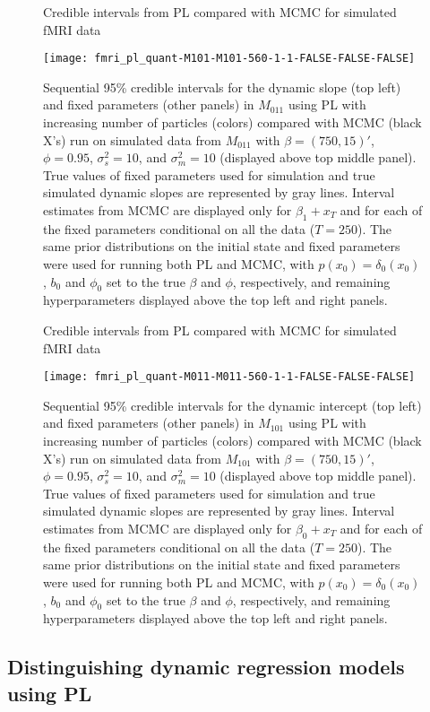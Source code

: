 \begin{figure}
\ssp
\centering
\caption{Credible intervals from PL compared with MCMC for simulated fMRI data} \label{fig:fmri:quant:M011}
\texttt{[image: fmri\_pl\_quant-M101-M101-560-1-1-FALSE-FALSE-FALSE]}
\caption*{Sequential 95\% credible intervals for the dynamic slope (top left) and fixed parameters (other panels) in $M_{011}$ using PL with increasing number of particles (colors) compared with MCMC (black X's) run on simulated data from $M_{011}$ with $\beta = (750,15)'$, $\phi = 0.95$, $\sigma^2_s = 10$, and $\sigma^2_m = 10$ (displayed above top middle panel). True values of fixed parameters used for simulation and true simulated dynamic slopes are represented by gray lines. Interval estimates from MCMC are displayed only for $\beta_1 + x_T$ and for each of the fixed parameters conditional on all the data ($T = 250$). The same prior distributions on the initial state and fixed parameters were used for running both PL and MCMC, with $p(x_0) = \delta_{0}(x_0)$, $b_0$ and $\phi_0$ set to the true $\beta$ and $\phi$, respectively, and remaining hyperparameters displayed above the top left and right panels.}
\end{figure}

\begin{figure}
\ssp
\centering
\caption{Credible intervals from PL compared with MCMC for simulated fMRI data} \label{fig:fmri:quant:M101}
\texttt{[image: fmri\_pl\_quant-M011-M011-560-1-1-FALSE-FALSE-FALSE]}
\caption*{Sequential 95\% credible intervals for the dynamic intercept (top left) and fixed parameters (other panels) in $M_{101}$ using PL with increasing number of particles (colors) compared with MCMC (black X's) run on simulated data from $M_{101}$ with $\beta = (750,15)'$, $\phi = 0.95$, $\sigma^2_s = 10$, and $\sigma^2_m = 10$ (displayed above top middle panel). True values of fixed parameters used for simulation and true simulated dynamic slopes are represented by gray lines. Interval estimates from MCMC are displayed only for $\beta_0 + x_T$ and for each of the fixed parameters conditional on all the data ($T = 250$). The same prior distributions on the initial state and fixed parameters were used for running both PL and MCMC, with $p(x_0) = \delta_{0}(x_0)$, $b_0$ and $\phi_0$ set to the true $\beta$ and $\phi$, respectively, and remaining hyperparameters displayed above the top left and right panels.}
\end{figure}

\subsection{Distinguishing dynamic regression models using PL \label{sec:fmri:dist}}

